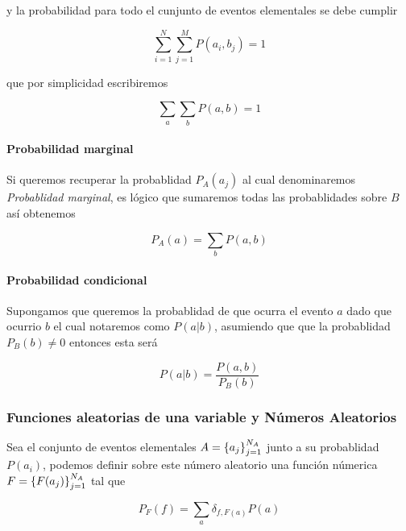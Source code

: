 y la probabilidad para todo el cunjunto de eventos elementales se debe cumplir

\begin{equation}
  \sum_{i=1}^N \sum_{j=1}^M P(a_i, b_j) = 1
  \label{eq:prob-conjunta-total}
\end{equation}

que por simplicidad escribiremos

\begin{equation}
  \sum_{a} \sum_{b} P(a, b) = 1
  \label{eq:prob-conjunta-total-sim}
\end{equation}

\paragraph*{Probabilidad marginal}
Si queremos recuperar la probablidad $P_A(a_j)$ al cual denominaremos
\textit{Probablidad marginal}, es lógico que sumaremos todas las
probablidades sobre $B$ así obtenemos

\begin{equation}
  P_A(a) = \sum_{b} P(a, b)
  \label{eq:prob-marginal}
\end{equation}

\paragraph*{Probabilidad condicional}
Supongamos que queremos la probablidad de que ocurra el evento
$a$ dado que ocurrio $b$ el cual notaremos como $P(a|b)$, asumiendo
que que la probablidad $P_B(b) \neq 0$ entonces esta será

\begin{equation}
  P(a|b) = \frac{P(a,b)}{P_B(b)}
  \label{eq:prob-condicional}
\end{equation}

\subsubsection{Funciones aleatorias de una variable y Números Aleatorios}
Sea el conjunto de eventos elementales $A = \left\{a_j\right\}_{j = 1}^{N_A}$ junto a
su probablidad $P(a_i)$, podemos definir sobre este número aleatorio
una función númerica $F = \left\{F(a_j)\right\}_{j = 1}^{N_A}$ tal que

\begin{equation}
  P_F(f) = \sum_a \delta_{f,F(a)} P(a)
  \label{eq:f-prob}
\end{equation}

